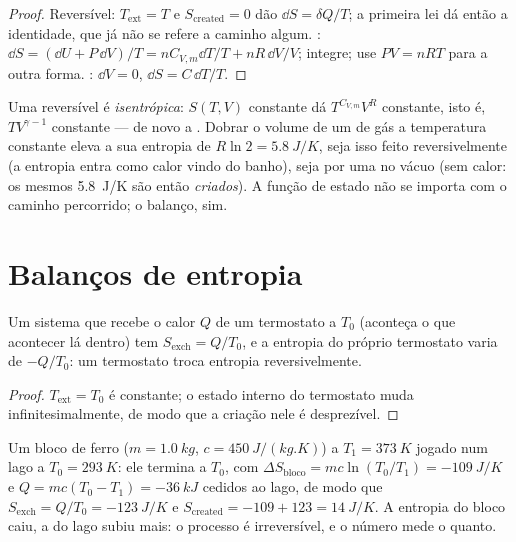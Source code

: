 \begin{proof}
Reversível: $T_{\mathrm{ext}} = T$ e $S_{\mathrm{created}} = 0$ dão $\dd S =
\delta Q/T$; a primeira lei dá então a identidade, que já não se refere
a caminho algum. : $\dd S = (\dd U + P\,\dd V)/T = nC_{V,m}\dd T/T
+ nR\,\dd V/V$; integre; use $PV = nRT$ para a outra forma. : $\dd V = 0$, $\dd S = C\,\dd T/T$.
\end{proof}

\begin{example}\label{ex:b1:second-law-entropy:formulas}
Uma  reversível é \emph{isentrópica}: $S(T, V)$
constante dá $T^{C_{V,m}}V^R$ constante, isto é, $TV^{\gamma - 1}$ constante ---
de novo a . Dobrar o volume de um  de gás a temperatura
constante eleva a sua entropia de $R\ln2 = \qty{5.8}{J/K}$, seja isso feito
reversivelmente (a entropia entra como calor vindo do banho), seja
por uma  no vácuo (sem calor: os mesmos \qty{5.8}{J/K} são
então \emph{criados}). A função de estado não se importa com o caminho
percorrido; o balanço, sim.
\end{example}

\section{Balanços de entropia}

\begin{proposition}\label{prop:b1:second-law-entropy:thermostat}
Um sistema que recebe o calor $Q$ de um termostato a $T_0$ (aconteça o que
acontecer lá dentro) tem $S_{\mathrm{exch}} = Q/T_0$, e a entropia do próprio
termostato varia de $-Q/T_0$: um termostato troca entropia reversivelmente.
\end{proposition}

\begin{proof}
$T_{\mathrm{ext}} = T_0$ é constante; o estado interno do termostato muda
infinitesimalmente, de modo que a criação nele é desprezível.
\end{proof}

\begin{example}\label{ex:b1:second-law-entropy:quench}
Um bloco de ferro ($m = \qty{1.0}{kg}$, $c = \qty{450}{J/(kg.K)}$) a $T_1 =
\qty{373}{K}$ jogado num lago a $T_0 = \qty{293}{K}$: ele termina a $T_0$,
com $\Delta S_{\text{bloco}} = mc\ln(T_0/T_1) = \qty{-109}{J/K}$ e $Q =
mc(T_0 - T_1) = \qty{-36}{kJ}$ cedidos ao lago, de modo que $S_{\mathrm{exch}} =
Q/T_0 = \qty{-123}{J/K}$ e $S_{\mathrm{created}} = -109 + 123 = \qty{+14}{J/K}$.
A entropia do bloco caiu, a do lago subiu mais: o processo é
irreversível, e o número mede o quanto.
\end{example}

